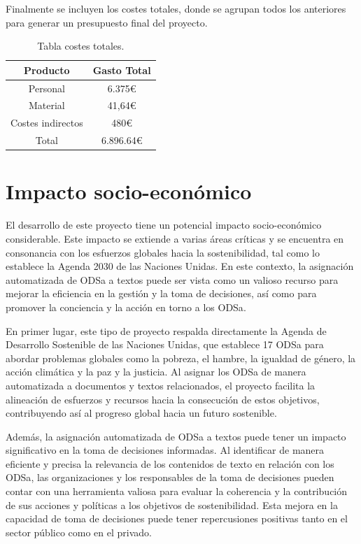Finalmente se incluyen los costes totales, donde se agrupan todos los anteriores
para generar un presupuesto final del proyecto.
\begin{table}[H]
\centering
\begin{tabular}{|c|c|}
\hline
\textbf{Producto} & \textbf{Gasto Total} \\\hline
Personal          & 6.375€  \\\hline
Material          & 41,64€    \\\hline
Costes indirectos & 480€    \\\hline
Total             & 6.896.64€  \\\hline

\end{tabular}
  \caption{Tabla costes totales.}
  \label{tab:03_32}
\end{table}

\section{Impacto socio-económico} 
El desarrollo de este proyecto tiene un potencial impacto
socio-económico considerable. Este impacto se extiende a varias áreas críticas y
se encuentra en consonancia con los esfuerzos globales hacia la sostenibilidad,
tal como lo establece la Agenda 2030 de las Naciones Unidas. En este contexto,
la asignación automatizada de \gls{ODSa} a textos puede ser vista como un valioso
recurso para mejorar la eficiencia en la gestión y la toma de decisiones, así
como para promover la conciencia y la acción en torno a los \gls{ODSa}.

En primer lugar, este tipo de proyecto respalda directamente la Agenda de
Desarrollo Sostenible de las Naciones Unidas, que establece 17 \gls{ODSa} para abordar
problemas globales como la pobreza, el hambre, la igualdad de género, la acción
climática y la paz y la justicia. Al asignar los \gls{ODSa} de manera automatizada a
documentos y textos relacionados, el proyecto facilita la alineación de
esfuerzos y recursos hacia la consecución de estos objetivos, contribuyendo así
al progreso global hacia un futuro sostenible.

Además, la asignación automatizada de \gls{ODSa} a textos puede tener un impacto
significativo en la toma de decisiones informadas. Al identificar de manera
eficiente y precisa la relevancia de los contenidos de texto en relación con los
\gls{ODSa}, las organizaciones y los responsables de la toma de decisiones pueden
contar con una herramienta valiosa para evaluar la coherencia y la contribución
de sus acciones y políticas a los objetivos de sostenibilidad. Esta mejora en la
capacidad de toma de decisiones puede tener repercusiones positivas tanto en el
sector público como en el privado.


